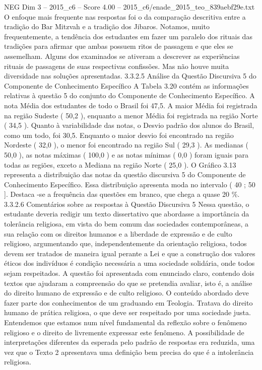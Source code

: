\begin{textsample}{NEG Dim 3 – 2015\_c6 – Score 4.00 – 2015\_c6/enade\_2015\_teo\_839aebf29e.txt}
O enfoque mais frequente nas respostas foi o da comparação descritiva entre a tradição do Bar Mitzvah e a tradição dos Jibaros.
Notamos, muito frequentemente, a tendência dos estudantes em fazer um paralelo dos rituais das tradições para afirmar que ambas possuem ritos de passagem e que eles se assemelham.
Alguns dos examinados se ativeram a descrever as experiências rituais de passagens de suas respectivas confissões.
Mas não houve muita diversidade nas soluções apresentadas. 3.3.2.5 Análise da Questão Discursiva 5 do Componente de Conhecimento Específico A Tabela 3.20 contém as informações relativas à questão 5 do conjunto do Componente de Conhecimento Específico.
A nota Média dos estudantes de todo o Brasil foi 47,5.
A maior Média foi registrada na região Sudeste ( 50,2 ), enquanto a menor Média foi registrada na região Norte ( 34,5 ).
Quanto à variabilidade das notas, o Desvio padrão dos alunos do Brasil, como um todo, foi 30,5.
Enquanto o maior desvio foi encontrado na região Nordeste ( 32,0 ), o menor foi encontrado na região Sul ( 29,3 ).
As medianas ( 50,0 ), as notas máximas ( 100,0 ) e as notas mínimas ( 0,0 ) foram iguais para todas as regiões, exceto a Mediana na região Norte ( 25,0 ).
O Gráfico 3.13 representa a distribuição das notas da questão discursiva 5 do Componente de Conhecimento Específico.
Essa distribuição apresenta moda no intervalo ( 40 ; 50 ].
Destaca -se a frequência das questões em branco, que chega a quase 20 \%. 3.3.2.6 Comentários sobre as respostas à Questão Discursiva 5 Nessa questão, o estudante deveria redigir um texto dissertativo que abordasse a importância da tolerância religiosa, em vista do bem comum das sociedades contemporâneas, a sua relação com os direitos humanos e a liberdade de expressão e de culto religioso, argumentando que, independentemente da orientação religiosa, todos devem ser tratados de maneira igual perante a Lei e que a construção dos valores éticos dos indivíduos é condição necessária a uma sociedade solidária, onde todos sejam respeitados.
A questão foi apresentada com enunciado claro, contendo dois textos que ajudaram a compreensão do que se pretendia avaliar, isto é, a análise do direito humano de expressão e de culto religioso.
O conteúdo abordado deve fazer parte dos conhecimentos de um graduando em Teologia.
Tratava do direito humano de prática religiosa, o que deve ser respeitado por uma sociedade justa.
Entendemos que estamos num nível fundamental da reflexão sobre o fenômeno religioso e o direito de livremente expressar este fenômeno.
A possibilidade de interpretações diferentes da esperada pelo padrão de respostas era reduzida, uma vez que o Texto 2 apresentava uma definição bem precisa do que é a intolerância religiosa.

\end{textsample}
